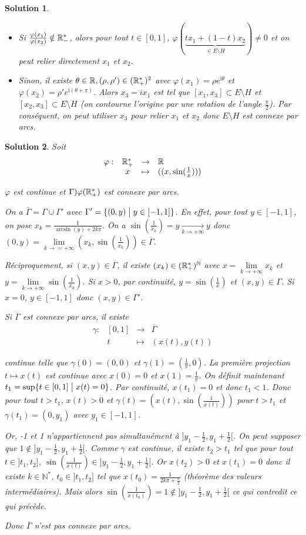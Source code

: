 \documentclass[12pt]{article}
\newtheorem{solution}{Solution}[section]
\theoremstyle{remark}
\newcommand{\N}{\mathbb{N}} \newcommand{\Z}{\mathbb{Z}}
\newcommand{\function}[5]{
	$$
	\begin{array}{rccl}
		#1: & #2 & \to & #3 \\
		& #4 & \mapsto & #5
	\end{array}
	$$
}
\begin{document}
\begin{solution}
\begin{enumerate}
		\begin{itemize}
			\item Si $\frac{\varphi(x_{1})}{\varphi(x_{2})}\notin\mathbb{R}_{-}^{*}$, alors pour tout $t\in[0,1]$, $\varphi(\underbrace{tx_{1}+(1-t)x_{2}}_{\in E\setminus H})\neq0$ et on peut relier directement $x_{1}$ et $x_{2}$.
			\item Sinon, il existe $\theta\in\mathbb{R},(\rho,\rho')\in(\mathbb{R}_{+}^{*})^{2}$ avec $\varphi(x_{1})=\rho e^{\mathrm{i}\theta}$ et $\varphi(x_{2})=\rho'e^{\mathrm{i}(\theta+\pi)}$. Alors $x_{3}=ix_{1}$ est tel que $[x_{1},x_{3}]\subset E\setminus H$ et $[x_{2},x_{3}]\subset E\setminus H$ (on contourne l'origine par une rotation de l'angle $\frac{\pi}{2}$). Par conséquent, on peut utiliser $x_{3}$ pour relier $x_{1}$ et $x_{2}$ donc $E\setminus H$ est connexe par arcs.
		\end{itemize}
	\end{enumerate}
\end{solution}

\begin{solution}
	Soit \function{\varphi}{\R_{+}^{*}}{\R}{x}{((x,\sin(\frac{1}{x})))}
	$\varphi$ est continue et $\Gamma)\varphi(\mathbb{R}_{+}^{*})$ est connexe par arcs.

	On a $\overline{\Gamma}=\Gamma\cup\Gamma'$ avec $\Gamma'=\{(0,y)\bigm| y\in[-1,1]\}$. En effet, pour tout $y\in[-1,1]$, on pose $x_{k}=\frac{1}{\arcsin(y)+2k\pi}$. On a $\sin(\frac{1}{x_{k}})=y\xrightarrow[k\to+\infty]{}y$ donc $(0,y)=\lim\limits_{k\to=+\infty}(x_{k},\sin(\frac{1}{x_{k}}))\in\overline{\Gamma}$.

	Réciproquement, si $(x,y)\in\overline{\Gamma}$, il existe $(x_{k})\in(\R_{+}^{*})^{\N}$ avec $x=\lim\limits_{k\to+\infty}x_{k}$ et $y=\lim\limits_{k\to+\infty}\sin(\frac{1}{x_{k}})$. Si $x>0$, par continuité, $y=\sin(\frac{1}{x})$ et $(x,y)\in\Gamma$. Si $x=0$, $y\in[-1,1]$ donc $(x,y)\in\Gamma'$.

	Si $\overline{\Gamma}$ est connexe par arcs, il existe \function{\gamma}{[0,1]}{\overline{\Gamma}}{t}{(x(t),y(t))}
	continue telle que $\gamma(0)=(0,0)$ et $\gamma(1)=(\frac{1}{\pi},0)$. La première projection $t\mapsto x(t)$ est continue avec $x(0)=0$ et $x(1)=\frac{1}{\pi}$. On définit maintenant $t_{1}=\sup\{t\in[0,1]\bigm| x(t)=0\}$. Par continuité, $x(t_{1})=0$ et donc $t_{1}<1$. Donc pour tout $t>t_{1}$, $x(t)>0$ et $\gamma(t)=(x(t),\sin(\frac{1}{x(t)}))$ pour $t>t_{1}$ et $\gamma(t_{1})=(0,y_{1})$ avec $y_{1}\in[-1,1]$.

	Or, -1 et 1 n'appartiennent pas simultanément à $]y_{1}-\frac{1}{2},y_{1}+\frac{1}{2}[$. On peut supposer que $1\notin]y_{1}-\frac{1}{2},y_{1}+\frac{1}{2}[$. Comme $\gamma$ est continue, il existe $t_{2}>t_{1}$ tel que pour tout $t\in]t_{1},t_{2}]$, $\sin(\frac{1}{x(t)})\in]y_{1}-\frac{1}{2},y_{1}+\frac{1}{2}[$. Or $x(t_{2})>0$ et $x(t_{1})=0$ donc il existe $k\in\N^{*}$, $t_{0}\in]t_{1},t_{2}]$ tel que $x(t_{0})=\frac{1}{2k\pi+\frac{\pi}{2}}$ (théorème des valeurs intermédiaires). Mais alors $\sin(\frac{1}{x(t_{0})})=1\notin]y_{1}-\frac{1}{2},y_{1}+\frac{1}{2}[$ ce qui contredit ce qui précède.

	Donc $\overline{\Gamma}$ n'est pas connexe par arcs.
\end{solution}
\end{document}
